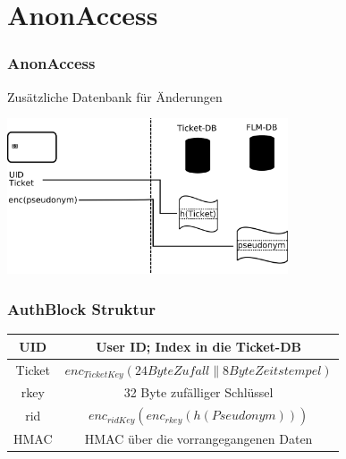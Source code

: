 \section{AnonAccess}


\begin{frame}
	\frametitle{AnonAccess}
	Zusätzliche Datenbank für Änderungen
	\begin{center}\includegraphics[width=8.3cm]{ansatz3.png}\end{center}
\end{frame}



\begin{frame}
	\frametitle{AuthBlock Struktur}
\begin{tabular}{|c|c|}
\hline UID & User ID; Index in die Ticket-DB \\ 
\hline Ticket   & $enc_{TicketKey}(24 Byte Zufall \parallel 8 Byte Zeitstempel)$ \\ 
\hline rkey     & 32 Byte zufälliger Schlüssel \\ 
\hline rid      & $enc_{ridKey}\left(enc_{rkey}\left(h\left(Pseudonym\right)\right)\right)$ \\ 
\hline HMAC     & HMAC über die vorrangegangenen Daten \\ 
\hline 
\end{tabular} 
\end{frame}


